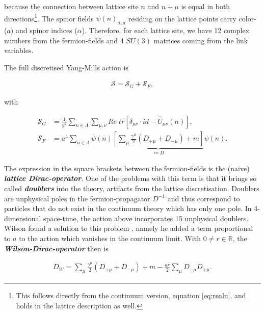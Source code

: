 \documentclass{article}
\theoremstyle{plain} %
\theoremstyle{convention} %
\theoremstyle{remark} %
\def\df#1{\textbf{\textit{#1}}}
\numberwithin{equation}{section}
\begin{document}
because the connection between lattice site $n$ and $n + \mu$ is equal in both directions\footnote{This follows directly from the continuum version, equation \eqref{eq:realu}, and holds in the lattice description as well.}. The spinor fields $\psi(n)_{\alpha,a}$ residing on the lattice points carry color- ($a$) and spinor indices ($\alpha$). Therefore, for each lattice site, we have \num{12} complex numbers from the fermion-fields and \num{4} $SU(3)$ matrices coming from the link variables.

The full discretised Yang-Mills action is

\begin{align*}
    \mathcal{S} = \mathcal{S}_G + \mathcal{S}_F,
\end{align*}

with

\begin{align*}
    \mathcal{S}_G &= \frac{1}{g^2} \sum_{n \in \Lambda} \sum_{\mu, \nu} Re \; tr\left[ \delta_{\mu \nu} \cdot id - \hat{U}_{\mu \nu}(n) \right], \\
    \mathcal{S}_F &= a^4 \sum_{n \in \Lambda} \bar{\psi}(n) \underbrace{\left[ \sum_{\mu} \frac{\gamma^{\mu}}{2} (D_{+\mu} + D_{-\mu}) + m \right]}_{\coloneqq D} \psi(n).
\end{align*}

The expression in the square brackets between the fermion-fields is the (naive) \df{lattice Dirac-operator}. One of the problems with this term is that it brings so called \df{doublers} into the theory, artifacts from the lattice discretisation. Doublers are unphysical poles in the fermion-propagator $D^{-1}$ and thus correspond to particles that do not exist in the continuum theory which has only one pole. In 4-dimensional space-time, the action above incorporates \num{15} unphysical doublers\footnotemark. Wilson found a solution to this problem \cite{wilson1974}, namely he added a term proportional to $a$ to the action which vanishes in the continuum limit. With $0 \ne r \in \mathbb{R}$, the \df{Wilson-Dirac-operator} then is


\begin{align}
    D_W = \sum_{\mu} \frac{\gamma^{\mu}}{2} (D_{+\mu} + D_{-\mu}) + m - \frac{a r}{2} \sum_{\mu} D_{-\mu} D_{+\mu}. \label{eq:dwop}
\end{align}
\end{document}
